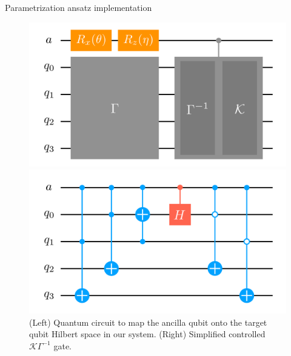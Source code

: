 \documentclass[9pt, handout, aspectratio=169]{beamer}	%
\begin{document}
\begin{frame}[allowframebreaks]{Parametrization ansatz implementation}
	\begin{figure}[!p]
		\centering
		\begin{minipage}[c]{.45\linewidth}
			\centering
			\includegraphics[width=\linewidth]{Figures/NJL1-model-solving/ansatz-implementation-ancilla-mapping}
		\end{minipage}
		\hspace{.025\linewidth}
		\begin{minipage}[c]{.45\linewidth}
			\centering
			\includegraphics[width=\linewidth]{Figures/NJL1-model-solving/ansatz-implementation-controlled-gammakappa}
		\end{minipage}
		\caption{(Left) Quantum circuit to map the ancilla qubit onto the target qubit Hilbert space in our system. (Right) Simplified controlled $\mathcal{K}\Gamma^{-1}$ gate.}
	\end{figure}

\break


\end{frame}
\end{document}
